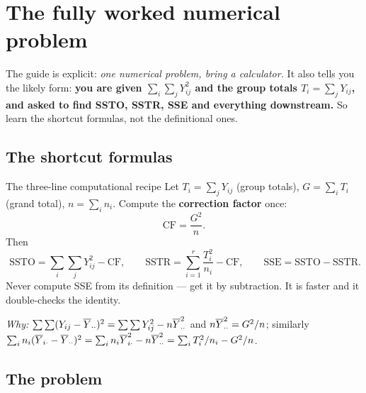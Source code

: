 \documentclass[11pt]{article}
\begin{document}
\section{The fully worked numerical problem}\label{sec:numeric}

The guide is explicit: \emph{one numerical problem, bring a calculator.} It also tells you
the likely form: \textbf{you are given $\sum_i\sum_j Y_{ij}^2$ and the group totals
$T_i=\sum_j Y_{ij}$, and asked to find SSTO, SSTR, SSE and everything downstream.} So learn
the shortcut formulas, not the definitional ones.

\subsection{The shortcut formulas}

\begin{recipe}{The three-line computational recipe}
Let $T_i=\sum_j Y_{ij}$ (group totals), $G=\sum_i T_i$ (grand total), $n=\sum_i n_i$.
Compute the \textbf{correction factor} once:
\[
  \mathrm{CF}=\frac{G^2}{n} .
\]
Then
\[
  \boxed{\ \mathrm{SSTO}=\sum_i\sum_j Y_{ij}^2-\mathrm{CF},
  \qquad
  \mathrm{SSTR}=\sum_{i=1}^r\frac{T_i^2}{n_i}-\mathrm{CF},
  \qquad
  \mathrm{SSE}=\mathrm{SSTO}-\mathrm{SSTR}. }
\]
Never compute SSE from its definition --- get it by subtraction. It is faster and it
double-checks the identity.
\end{recipe}

\textit{Why:} $\sum\sum(Y_{ij}-\overline{Y}_{\cdot\cdot})^2=\sum\sum Y_{ij}^2-n\overline{Y}_{\cdot\cdot}^2$
and $n\overline{Y}_{\cdot\cdot}^2=G^2/n$; similarly
$\sum_i n_i(\overline{Y}_{i\cdot}-\overline{Y}_{\cdot\cdot})^2=\sum_i n_i\overline{Y}_{i\cdot}^2-n\overline{Y}_{\cdot\cdot}^2
=\sum_i T_i^2/n_i - G^2/n$.

\subsection{The problem}
\end{document}
